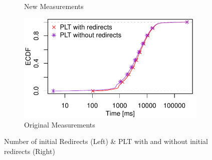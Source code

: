 \begin{frame}
\begin{figure}
\begin{subfigure}{0.5\textwidth}
	\caption{New Measurements}
	\label{fig:new_plot_redirects}
	\par\medskip
	\includegraphics[width=.8\linewidth,keepaspectratio]{Original Plots/ecdf_loadtimes.pdf}
	\caption{Original Measurements}
	\label{fig:orig_plot_redirects}
	\end{subfigure}
\caption{Number of initial Redirects (Left) \& PLT with and without initial redirects (Right)}
\end{figure}

\end{frame}

